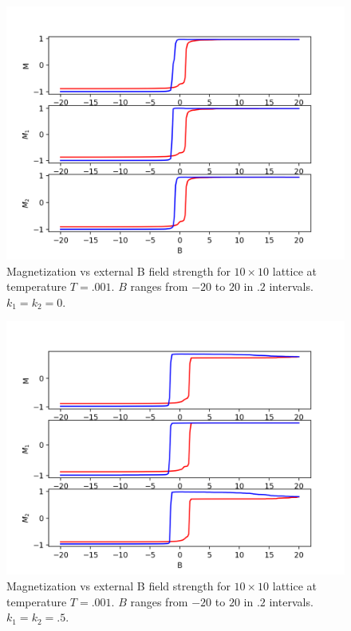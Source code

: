 \documentclass{article}
\begin{document}
\begin{figure}

  \includegraphics[width=\textwidth]{figures/magvb_b_20_k_0.png}

\caption{Magnetization vs external B field strength for $10 \times 10$ lattice at temperature $T = .001$. $B$ ranges from $-20$ to $20$ in $.2$ intervals. $k_{1} = k_{2} = 0$.
}
\end{figure}

\begin{figure}

  \includegraphics[width=\textwidth]{figures/magvb_b_20_k_p5.png}

\caption{Magnetization vs external B field strength for $10 \times 10$ lattice at temperature $T = .001$. $B$ ranges from $-20$ to $20$ in $.2$ intervals. $k_{1} = k_{2} = .5$.
}
\end{figure}
\end{document}
